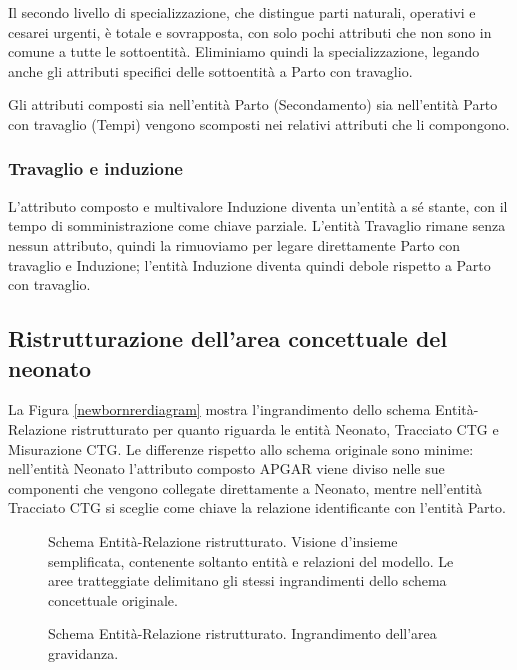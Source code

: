 Il secondo livello di specializzazione, che distingue parti naturali, operativi e cesarei urgenti, è totale e sovrapposta, con solo pochi attributi che non sono in comune a tutte le sottoentità.
Eliminiamo quindi la specializzazione, legando anche gli attributi specifici delle sottoentità a Parto con travaglio.

Gli attributi composti sia nell'entità Parto (Secondamento) sia nell'entità Parto con travaglio (Tempi) vengono scomposti nei relativi attributi che li compongono.

\subsubsection{Travaglio e induzione}

L'attributo composto e multivalore Induzione diventa un'entità a sé stante, con il tempo di somministrazione come chiave parziale.
L'entità Travaglio rimane senza nessun attributo, quindi la rimuoviamo per legare direttamente Parto con travaglio e Induzione; l'entità Induzione diventa quindi debole rispetto a Parto con travaglio.

\subsection{Ristrutturazione dell'area concettuale del neonato}

La Figura \ref{newbornrerdiagram} mostra l'ingrandimento dello schema Entità-Relazione ristrutturato per quanto riguarda le entità Neonato, Tracciato CTG e Misurazione CTG.
Le differenze rispetto allo schema originale sono minime: nell'entità Neonato l'attributo composto APGAR viene diviso nelle sue componenti che vengono collegate direttamente a Neonato, mentre nell'entità Tracciato CTG si sceglie come chiave la relazione identificante con l'entità Parto.

\begin{figure}
    \centering
    
    \caption{Schema Entità-Relazione ristrutturato. Visione d'insieme semplificata, contenente soltanto entità e relazioni del modello. Le aree tratteggiate delimitano gli stessi ingrandimenti dello schema concettuale originale.}
    \label{completererdiagram}
\end{figure}

\begin{figure}
    \centering
    
    \caption{Schema Entità-Relazione ristrutturato. Ingrandimento dell'area gravidanza.}
\label{pregnancyrerdiagram}
\end{figure}

